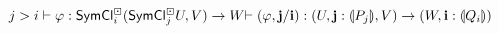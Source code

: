 \documentclass[a4paper]{memoir}
\begin{document}
\begin{figure}
\[{			j > i
			\\
			\vdash \varphi : \mathsf{SymCl}^\boxdot_i(\mathsf{SymCl}^\boxdot_j U, V) \to W
		}{
			\vdash (\varphi, \mathbf{j} / \mathbf{i}) : (U, \mathbf{j} : {\llparenthesis P_j \rrparenthesis}, V) \to (W, \mathbf{i} : {\llparenthesis Q_i \rrparenthesis})
		}{}
	\]

\end{figure}
\end{document}
